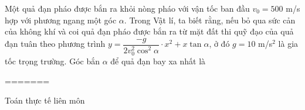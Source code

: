 \begin{ex}%
	Một quả đạn pháo được bắn ra khỏi nòng pháo với vận tốc ban đầu $ v_0=500$ m/s hợp với phương ngang một góc $ \alpha $. Trong Vật lí, ta biết rằng, nếu bỏ qua sức cản của không khí và coi quả đạn pháo được bắn ra từ mặt đất thi quỹ đạo của quả đạn tuân theo phương trình $ y=\dfrac{-g}{2v_0^2\cos^2\alpha}\cdot x^2+x\tan \alpha $, ở đó $g = 10$ m/s$ ^2 $ là gia tốc trọng trường. Góc bắn $ \alpha $ để quả đạn bay xa nhất là
\end{ex}


=======
\begin{dang}{Toán thực tế liên môn}	
\end{dang}
